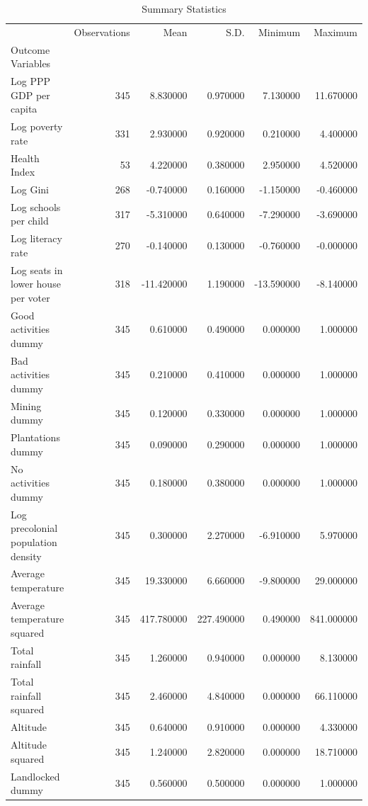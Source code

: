 \begin{table}
\caption{Summary Statistics}
\label{tab:summary_stats}
\begin{tabular}{lrrrrr}
\toprule
 & Observations & Mean & S.D. & Minimum & Maximum \\
Outcome Variables &  &  &  &  &  \\
\midrule
Log PPP GDP per capita & 345 & 8.830000 & 0.970000 & 7.130000 & 11.670000 \\
Log poverty rate & 331 & 2.930000 & 0.920000 & 0.210000 & 4.400000 \\
Health Index & 53 & 4.220000 & 0.380000 & 2.950000 & 4.520000 \\
Log Gini & 268 & -0.740000 & 0.160000 & -1.150000 & -0.460000 \\
Log schools per child & 317 & -5.310000 & 0.640000 & -7.290000 & -3.690000 \\
Log literacy rate & 270 & -0.140000 & 0.130000 & -0.760000 & -0.000000 \\
Log seats in lower house per voter & 318 & -11.420000 & 1.190000 & -13.590000 & -8.140000 \\
Good activities dummy & 345 & 0.610000 & 0.490000 & 0.000000 & 1.000000 \\
Bad activities dummy & 345 & 0.210000 & 0.410000 & 0.000000 & 1.000000 \\
Mining dummy & 345 & 0.120000 & 0.330000 & 0.000000 & 1.000000 \\
Plantations dummy & 345 & 0.090000 & 0.290000 & 0.000000 & 1.000000 \\
No activities dummy & 345 & 0.180000 & 0.380000 & 0.000000 & 1.000000 \\
Log precolonial population density & 345 & 0.300000 & 2.270000 & -6.910000 & 5.970000 \\
Average temperature & 345 & 19.330000 & 6.660000 & -9.800000 & 29.000000 \\
Average temperature squared & 345 & 417.780000 & 227.490000 & 0.490000 & 841.000000 \\
Total rainfall & 345 & 1.260000 & 0.940000 & 0.000000 & 8.130000 \\
Total rainfall squared & 345 & 2.460000 & 4.840000 & 0.000000 & 66.110000 \\
Altitude & 345 & 0.640000 & 0.910000 & 0.000000 & 4.330000 \\
Altitude squared & 345 & 1.240000 & 2.820000 & 0.000000 & 18.710000 \\
Landlocked dummy & 345 & 0.560000 & 0.500000 & 0.000000 & 1.000000 \\
\bottomrule
\end{tabular}
\end{table}
